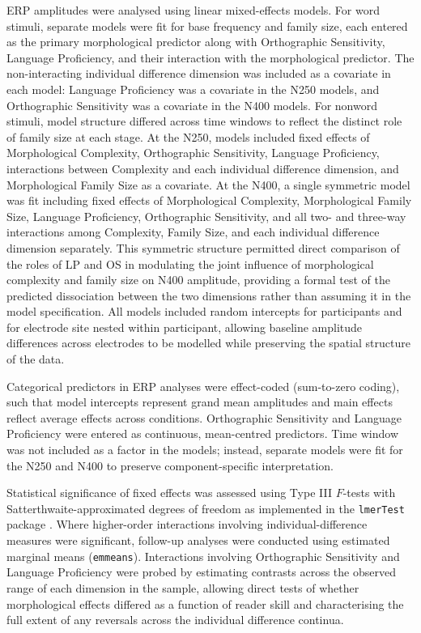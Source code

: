 \documentclass[utf8]{FrontiersinHarvard} %
\begin{document}
	ERP amplitudes were analysed using linear mixed-effects models. For word stimuli, separate models were fit for base frequency and family size, each entered as the primary morphological predictor along with Orthographic Sensitivity, Language Proficiency, and their interaction with the morphological predictor. The non-interacting individual difference dimension was included as a covariate in each model: Language Proficiency was a covariate in the N250 models, and Orthographic Sensitivity was a covariate in the N400 models. For nonword stimuli, model structure differed across time windows to reflect the distinct role of family size at each stage. At the N250, models included fixed effects of Morphological Complexity, Orthographic Sensitivity, Language Proficiency, interactions between Complexity and each individual difference dimension, and Morphological Family Size as a covariate. At the N400, a single symmetric model was fit including fixed effects of Morphological Complexity, Morphological Family Size, Language Proficiency, Orthographic Sensitivity, and all two- and three-way interactions among Complexity, Family Size, and each individual difference dimension separately. This symmetric structure permitted direct comparison of the roles of LP and OS in modulating the joint influence of morphological complexity and family size on N400 amplitude, providing a formal test of the predicted dissociation between the two dimensions rather than assuming it in the model specification. All models included random intercepts for participants and for electrode site nested within participant, allowing baseline amplitude differences across electrodes to be modelled while preserving the spatial structure of the data.
	
	Categorical predictors in ERP analyses were effect-coded (sum-to-zero coding), such that model intercepts represent grand mean amplitudes and main effects reflect average effects across conditions. Orthographic Sensitivity and Language Proficiency were entered as continuous, mean-centred predictors. Time window was not included as a factor in the models; instead, separate models were fit for the N250 and N400 to preserve component-specific interpretation.
	
	Statistical significance of fixed effects was assessed using Type III $F$-tests with Satterthwaite-approximated degrees of freedom as implemented in the \texttt{lmerTest} package \citep{batesFittingLinearMixedeffects2015}. Where higher-order interactions involving individual-difference measures were significant, follow-up analyses were conducted using estimated marginal means (\texttt{emmeans}). Interactions involving Orthographic Sensitivity and Language Proficiency were probed by estimating contrasts across the observed range of each dimension in the sample, allowing direct tests of whether morphological effects differed as a function of reader skill and characterising the full extent of any reversals across the individual difference continua.
	
\end{document}
